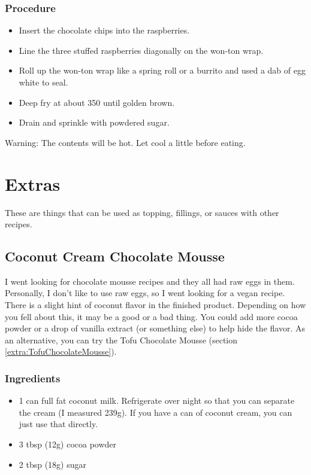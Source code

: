 \documentclass[10pt, openany]{book}
\begin{document}
\subsection{Procedure}
\begin{itemize}
  \item Insert the chocolate chips into the raspberries.
  \item Line the three stuffed raspberries diagonally on the won-ton wrap.
  \item Roll up the won-ton wrap like a spring roll or a burrito and used a dab of egg white to seal.
  \item Deep fry at about 350\degree{} until golden brown.
  \item Drain and sprinkle with powdered sugar.
\end{itemize}
Warning: The contents will be hot.  Let cool a little before eating.

\chapter{Extras}
These are things that can be used as topping, fillings, or sauces with other recipes.

\section{Coconut Cream Chocolate Mousse}
\label{extra:CCChocolateMousse}
I went looking for chocolate mousse recipes and they all had raw eggs in them.  Personally, I don't like to use raw eggs, so I went looking for a vegan recipe.  There is a slight hint of coconut flavor in the finished product.  Depending on how you fell about this, it may be a good or a bad thing.  You could add more cocoa powder or a drop of vanilla extract (or something else) to help hide the flavor.  As an alternative, you can try the Tofu Chocolate Mousse (section \ref{extra:TofuChocolateMousse}).
\subsection{Ingredients}
\begin{itemize}
  \item 1 can full fat coconut milk.  Refrigerate over night so that you can separate the cream (I measured 239g).  If you have a can of coconut cream, you can just use that directly.
  \item 3 tbsp (12g) cocoa powder
  \item 2 tbsp (18g) sugar
\end{itemize}
\end{document}
